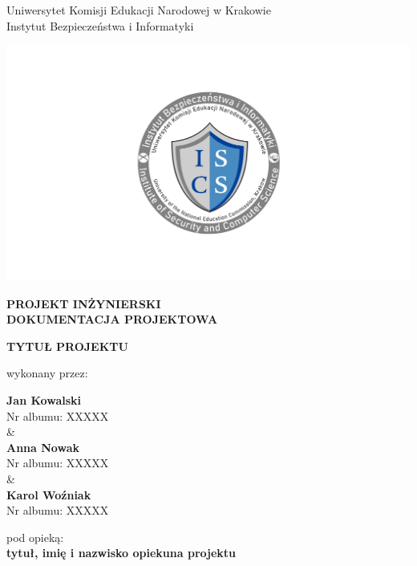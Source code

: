 \documentclass[12pt,a4paper,oneside]{article}
\theoremstyle{definition}
\numberwithin{equation}{section}
\begin{document}

\thispagestyle{empty}
\begin{titlepage}
\begin{center}\Large
Uniwersytet Komisji Edukacji Narodowej w Krakowie\\
\large
Instytut Bezpieczeństwa i Informatyki\\
\vskip 10pt
\end{center}
\begin{center}
\centering \includegraphics[width=1.0\columnwidth]{images/logo.png}
\end{center}

\begin{center}
 {\bf \fontsize{14pt}{14pt}\selectfont PROJEKT INŻYNIERSKI \\ DOKUMENTACJA PROJEKTOWA}
\end{center}
\vskip 5pt
\begin{center}
 {\bf \fontsize{22pt}{22pt}\selectfont TYTUŁ PROJEKTU}
\end{center}



\begin{center}
 {\fontsize{12pt}{12pt}\selectfont wykonany przez: }
\end{center}
\begin{center}
 {\bf\fontsize{16pt}{16pt}\selectfont Jan Kowalski}\\
 {\fontsize{12pt}{12pt}\selectfont Nr albumu: XXXXX \\\&\\}
 {\bf\fontsize{16pt}{16pt}\selectfont Anna Nowak}\\
 {\fontsize{12pt}{12pt}\selectfont Nr albumu: XXXXX\\\&\\}
 {\bf\fontsize{16pt}{16pt}\selectfont Karol Woźniak}\\
 {\fontsize{12pt}{12pt}\selectfont Nr albumu: XXXXX}
\end{center}
\begin{center}
 {\fontsize{12pt}{12pt}\selectfont pod opieką:}\\
 {\bf\fontsize{12pt}{12pt}\selectfont tytuł, imię i nazwisko opiekuna projektu}
\end{center}


\end{titlepage}
\end{document}
